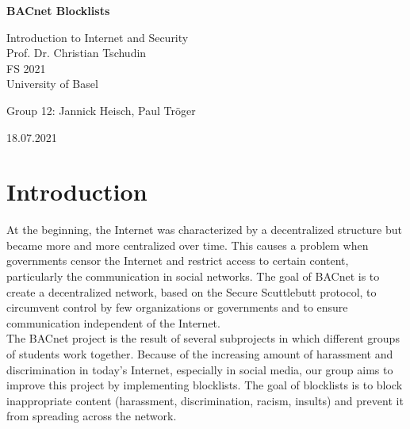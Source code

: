\documentclass[12pt]{article}
\begin{document}
\begin{titlepage}
\centering
\vspace*{6cm}
{\huge\bfseries BACnet Blocklists\par}

\vspace{3cm}

{\Large Introduction to Internet and Security}\\
\vspace{0.1cm}
{\Large Prof. Dr. Christian Tschudin}\\
\vspace{0.2cm}
{\Large FS 2021}\\
\vspace{0.1cm}
{\Large University of Basel}

\vspace{1cm}

{\large Group 12: Jannick Heisch, Paul Tr\"oger}

\vspace{1cm}

{\large 18.07.2021}

\end{titlepage}


\section{Introduction}
At the beginning, the Internet was characterized by a decentralized structure but became more and more centralized over time.
This causes a problem when governments censor the Internet and restrict access to certain content, particularly the communication in social networks. 
The goal of BACnet is to create a decentralized network, based on the Secure Scuttlebutt protocol, to circumvent control by few organizations or governments and to ensure communication independent of the Internet. \\
The BACnet project is the result of several subprojects in which different groups of students work together. 
Because of the increasing amount of harassment and discrimination in today’s Internet, especially in social media, our group aims to improve this project by implementing blocklists. 
The goal of blocklists is to block inappropriate content (harassment, discrimination, racism, insults) and prevent it from spreading across the network.
\end{document}
